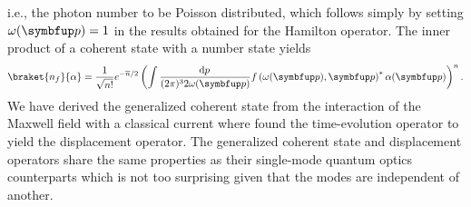 i.e., the photon number to be Poisson distributed, which follows simply by setting $\omega(\vb{p})=1$ in the results obtained for the Hamilton operator.
The inner product of a coherent state with a number state yields
\begin{equation}
	\braket{n_f}{\alpha}
	=
	\frac{1}{\sqrt{n!}}
	e^{-\overline{n}/2}
	\left(
		\int\frac{\dd{p}}{(2\pi)^32\omega(\vb{p})}
		f\left(\omega(\vb{p}),\vb{p}\right)^*
		\alpha(\vb{p})
	\right)^n
	.
\end{equation}
We have derived the generalized coherent state from the interaction of the Maxwell field with a classical current where found the time-evolution operator to yield the displacement operator.
The generalized coherent state and displacement operators share the same properties as their single-mode quantum optics counterparts which is not too surprising given that the modes are independent of another.